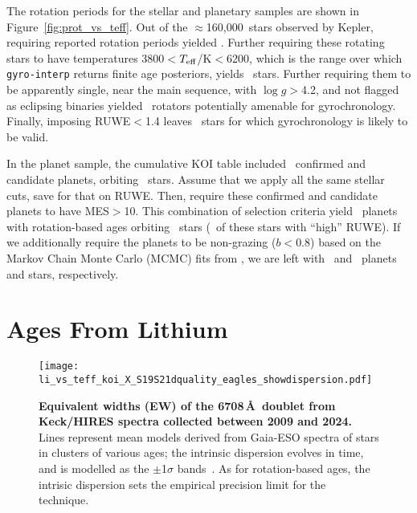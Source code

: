 \documentclass[11pt,twocolumn,tighten]{aastex63}
\newcommand{\nkeplerstars}{$\approx$160{,}000}
\begin{document}
The rotation periods for the stellar and planetary samples are shown
in Figure~\ref{fig:prot_vs_teff}.  Out of the \nkeplerstars\ stars
observed by Kepler, requiring reported rotation periods yielded
\nuniqstarsantosrot.  Further requiring these rotating stars
to have temperatures 3800$<$$T_{\rm eff}$/K$<$6200, which is the range
over which \texttt{gyro-interp} returns finite age posteriors,
yields \nuniqstarsantosrotteffcut\ stars.
Further requiring them to be apparently single, near the main
sequence, with $\log g$$>$4.2, and not flagged as
eclipsing binaries yielded \nuniqstarsantosallbutruwe\ rotators
potentially amenable for gyrochronology.
Finally, imposing RUWE$<$1.4 leaves \nuniqstarsantosrotgyroappl\ stars
for which gyrochronology is likely to be valid.


In the planet sample, the cumulative KOI table included
\nnonfpcumkois\ confirmed and candidate planets, orbiting
\nnonfpcumkoihosts\ stars.  Assume that we apply all the same stellar
cuts, save for that on RUWE.
Then,
require these confirmed and candidate planets to have MES$>$10.
This combination of selection criteria
yield \nplwgyroagewithgrazingandhighruwe\ planets with rotation-based
ages orbiting \nplhoststarwgyroagewithgrazingandhighruwe\ stars
(\nplhoststarwgyroagejusthighruwe\ of these stars with ``high'' RUWE).
If we additionally require the planets to be non-grazing ($b<0.8$)
based on the Markov Chain Monte Carlo (MCMC) fits from
\citet{Thompson_2018}, we are left with \nplwgyroagenograzing\ and
\nplhoststarwgyroagenograzing\ planets and stars, respectively.




\section{Ages From Lithium}
\label{sec:liage}

\begin{figure}[!t]
	\begin{center}
		\leavevmode
		\texttt{[image: li\_vs\_teff\_koi\_X\_S19S21dquality\_eagles\_showdispersion.pdf]}
	\end{center}
	\vspace{-0.6cm}
	\caption{
    {\bf Equivalent widths (EW) of the  6708\,\AA\ doublet
    from Keck/HIRES spectra collected between 2009 and 2024.}
    Lines represent mean models derived from Gaia-ESO spectra of stars
    in clusters of various ages; the intrinsic dispersion 
    evolves in time, and is modelled as the $\pm$1$\sigma$
    bands~\citep{Jeffries_2023}.
    As for rotation-based ages, the intrisic dispersion sets the
    empirical precision limit for the technique.
		\label{fig:li_vs_teff}
	}
\end{figure}
\end{document}
